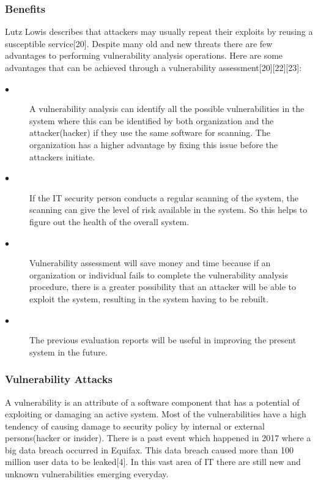 \subsubsection{Benefits}
Lutz Lowis describes that attackers may usually repeat their exploits by reusing a susceptible service[20]. Despite many old and new threats there are few advantages to performing vulnerability analysis operations. Here are some advantages that can be achieved through a vulnerability assessment[20][22][23]:
\begin{description}
	\item [$\bullet$]A vulnerability analysis can identify all the possible vulnerabilities in the system where this can be identified by both organization and the attacker(hacker) if they use the same software for scanning. The organization has a higher advantage by fixing this issue before the attackers initiate. 
	
	\item [$\bullet$]If the IT security person conducts a regular scanning of the system, the scanning can give the level of risk available in the system. So this helps to figure out the health of the overall system.
	
	\item [$\bullet$]Vulnerability assessment will save money and time because if an organization or individual fails to complete the vulnerability analysis procedure, there is a greater possibility that an attacker will be able to exploit the system, resulting in the system having to be rebuilt.
	
	\item [$\bullet$]The previous evaluation reports will be useful in improving the present system in the future.
\end{description}
\subsubsection{Vulnerability Attacks}
A vulnerability is an attribute of a software component that has a potential of exploiting or damaging an active system. Most of the vulnerabilities have a high tendency of causing damage to security policy by internal or external persons(hacker or insider). There is a past event which happened in 2017 where a big data breach occurred in Equifax. This data breach caused more than 100 million user data to be leaked[4]. In this vast area of IT there are still new and unknown vulnerabilities emerging everyday.

